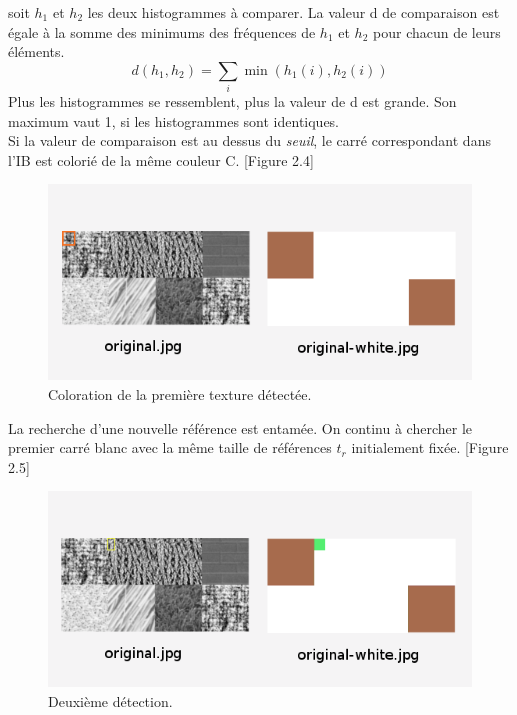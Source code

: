 soit $h_1$ et $h_2$ les deux histogrammes à comparer. La valeur d de comparaison est égale à la somme des minimums des fréquences de $h_1$ et $h_2$ pour chacun de leurs éléments.
$$d(h_1,h_2)=\sum\limits_{i}\min(h_1(i),h_2(i)) $$
Plus les histogrammes se ressemblent, plus la valeur de d est grande. Son maximum vaut 1, si les histogrammes sont identiques.\\
Si la valeur de comparaison est au dessus du \textit{seuil}, le carré correspondant dans l'IB est colorié de la même couleur C. [Figure 2.4]\\

\begin{figure}[H]
	\centering
		\includegraphics[width=14cm,]{Figures/chap2/4.png}
		
	\caption[coloriage1]{Coloration de la première texture détectée.}
	\label{fig:division}
\end{figure}

La recherche d'une nouvelle référence est entamée. On continu à chercher le premier carré blanc avec la même taille de références $t_r$ initialement fixée. [Figure 2.5]

\begin{figure}[H]
  \centering
    \includegraphics[width=14cm,]{Figures/chap2/5.png}
    
  \caption[detection2]{Deuxième détection.}
  \label{fig:division}
\end{figure}


